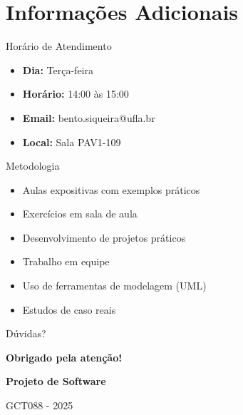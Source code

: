 \documentclass[aspectratio=169]{beamer}
\begin{document}
\section{Informações Adicionais}

\begin{frame}{Horário de Atendimento}
\begin{itemize}
    \item \textbf{Dia:} Terça-feira
    \item \textbf{Horário:} 14:00 às 15:00
    \item \textbf{Email:} bento.siqueira@ufla.br
    \item \textbf{Local:} Sala PAV1-109
\end{itemize}
\end{frame}

\begin{frame}{Metodologia}
\begin{itemize}
    \item Aulas expositivas com exemplos práticos
    \item Exercícios em sala de aula
    \item Desenvolvimento de projetos práticos
    \item Trabalho em equipe
    \item Uso de ferramentas de modelagem (UML)
    \item Estudos de caso reais
\end{itemize}
\end{frame}

\begin{frame}{Dúvidas?}
\begin{center}
\Large
\textbf{Obrigado pela atenção!}

\vspace{1cm}
\textbf{Projeto de Software}

\vspace{0.5cm}
GCT088 - 2025
\end{center}
\end{frame}
\end{document}

